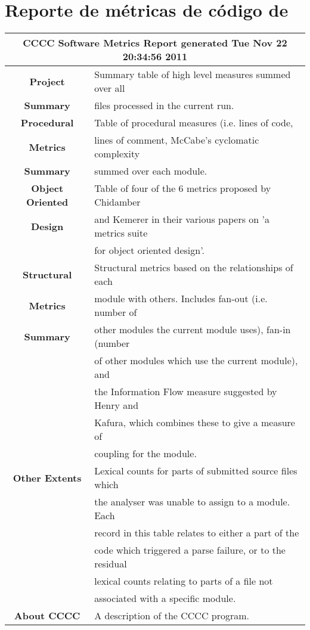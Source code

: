 \chapter{Reporte de métricas de código de \rc}
\label{recabs_metrics_report}

\begin{tabular}{|c|l|}
\hline
\multicolumn{2}{|c|}{CCCC Software Metrics Report generated Tue Nov 22 20:34:56 2011} \\
 \hline 
 \textbf{Project}       & Summary table of high level measures summed over all\\
 \textbf{Summary}       & files processed in the current run.  \\
 \hline 
 \textbf{Procedural}    & Table of procedural measures (i.e. lines of code, \\
 \textbf{Metrics}       & lines of comment, McCabe's cyclomatic complexity \\
 \textbf{Summary}       & summed over each module.  \\
 \hline 
 \textbf{Object Oriented} & Table of four of the 6 metrics proposed by Chidamber \\
 \textbf{Design}        & and Kemerer in their various papers on 'a metrics suite \\
                        & for object oriented design'. \\
 \hline 
 \textbf{Structural}    & Structural metrics based on the relationships of each \\
 \textbf{Metrics}       & module with others. Includes fan-out (i.e. number of \\
 \textbf{Summary}       & other modules the current module uses), fan-in (number \\
                        & of other modules which use the current module), and \\
                        & the Information Flow measure suggested by Henry and \\
                        & Kafura, which combines these to give a measure of \\
                        & coupling for the module. \\
 \hline 
 \textbf{Other Extents} & Lexical counts for parts of submitted source files which \\
                        & the analyser was unable to assign to a module. Each \\
                        & record in this table relates to either a part of the \\
                        & code which triggered a parse failure, or to the residual \\
                        & lexical counts relating to parts of a file not \\
                        & associated with a specific module. \\
 \hline 
 \textbf{About CCCC}    & A description of the CCCC program.  \\
 \hline 

\end{tabular}

